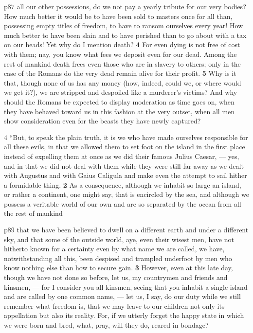 p87 all our other possessions, do we not pay a yearly tribute for our very bodies? How much better it would be to have been sold to masters once for all than, possessing empty titles of freedom, to have to ransom ourselves every year! How much better to have been slain and to have perished than to go about with a tax on our heads! Yet why do I mention death? \textbf{4} For even dying is not free of cost with them; nay, you know what fees we deposit even for our dead. Among the rest of mankind death frees even those who are in slavery to others; only in the case of the Romans do the very dead remain alive for their profit. \textbf{5} Why is it that, though none of us has any money (how, indeed, could we, or where would we get it?), we are stripped and despoiled like a murderer's victims? And why should the Romans be expected to display moderation as time goes on, when they have behaved toward us in this fashion at the very outset, when all men show consideration even for the beasts they have newly captured?

4 ``But, to speak the plain truth, it is we who have made ourselves responsible for all these evils, in that we allowed them to set foot on the island in the first place instead of expelling them at once as we did their famous Julius Caesar, \texthebrew{—} yes, and in that we did not deal with them while they were still far away as we dealt with Augustus and with Gaius Caligula and make even the attempt to sail hither a formidable thing. \textbf{2} As a consequence, although we inhabit so large an island, or rather a continent, one might say, that is encircled by the sea, and although we possess a veritable world of our own and are so separated by the ocean from all the rest of mankind

p89 that we have been believed to dwell on a different earth and under a different sky, and that some of the outside world, aye, even their wisest men, have not hitherto known for a certainty even by what name we are called, we have, notwithstanding all this, been despised and trampled underfoot by men who know nothing else than how to secure gain. \textbf{3} However, even at this late day, though we have not done so before, let us, my countrymen and friends and kinsmen, \texthebrew{—} for I consider you all kinsmen, seeing that you inhabit a single island and are called by one common name, \texthebrew{—} let us, I say, do our duty while we still remember what freedom is, that we may leave to our children not only its appellation but also its reality. For, if we utterly forget the happy state in which we were born and bred, what, pray, will they do, reared in bondage?

